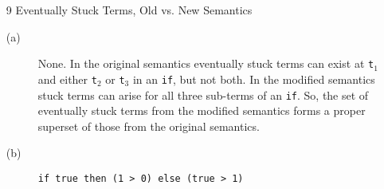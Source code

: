 \documentclass{article}
\begin{document}
\begin{description}
\begin{enumerate}
  \item[9]{Eventually Stuck Terms, Old vs. New Semantics}
    \begin{description}
      \item[(a)] None. In the original semantics eventually stuck terms can exist at \verb|t|$_1$ and either \verb|t|$_2$ or \verb|t|$_3$ in an \verb|if|, but not both. In the modified semantics stuck terms can arise for all three sub-terms of an \verb|if|. So, the set of eventually stuck terms from the modified semantics forms a proper superset of those from the original semantics.
      \item[(b)] \verb|if true then (1 > 0) else (true > 1)|
    \end{description}

  \end{enumerate}

\end{description}
\end{document}
